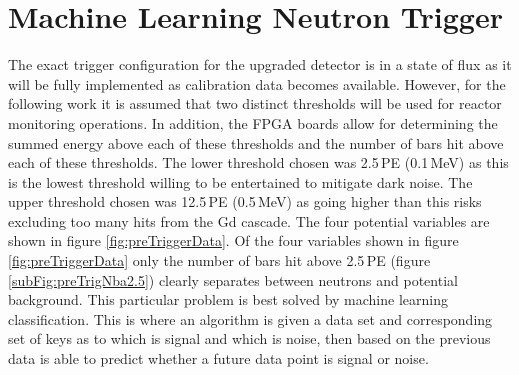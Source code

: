 \begin{figure}[!h]
\label{fig:2000_3000_p_secs}
\end{figure}

\clearpage
\section{Machine Learning Neutron Trigger}\label{sec:MachineLearningTrigger}
The exact trigger configuration for the upgraded detector is in a state of flux as it will be fully implemented as calibration data becomes available. However, for the following work it is assumed that two distinct thresholds will be used for reactor monitoring operations. In addition, the FPGA boards allow for determining the summed energy above each of these thresholds and the number of bars hit above each of these thresholds. The lower threshold chosen was 2.5\,PE (0.1\,MeV) as this is the lowest threshold willing to be entertained to mitigate dark noise. The upper threshold chosen was 12.5\,PE (0.5\,MeV) as going higher than this risks excluding too many hits from the Gd cascade. The four potential variables are shown in figure \ref{fig:preTriggerData}. Of the four variables shown in figure \ref{fig:preTriggerData} only the number of bars hit above 2.5\,PE (figure \ref{subFig:preTrigNba2.5}) clearly separates between neutrons and potential background. This particular problem is best solved by machine learning classification. This is where an algorithm is given a data set and corresponding set of keys as to which is signal and which is noise, then based on the previous data is able to predict whether a future data point is signal or noise.
